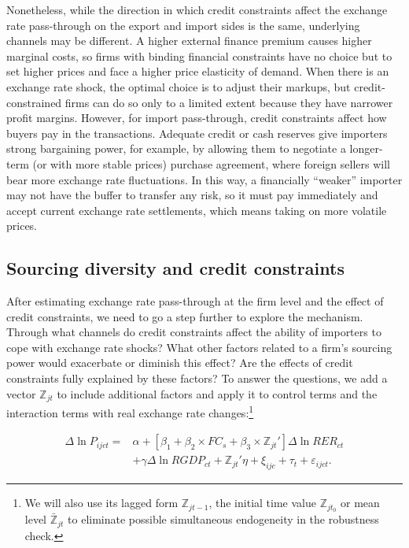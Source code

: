 Nonetheless, while the direction in which credit constraints affect the exchange rate pass-through on the export and import sides is the same, underlying channels may be different. A higher external finance premium causes higher marginal costs, so firms with binding financial constraints have no choice but to set higher prices and face a higher price elasticity of demand. When there is an exchange rate shock, the optimal choice is to adjust their markups, but credit-constrained firms can do so only to a limited extent because they have narrower profit margins. However, for import pass-through, credit constraints affect how buyers pay in the transactions. Adequate credit or cash reserves give importers strong bargaining power, for example, by allowing them to negotiate a longer-term (or with more stable prices) purchase agreement, where foreign sellers will bear more exchange rate fluctuations. In this way, a financially ``weaker'' importer may not have the buffer to transfer any risk, so it must pay immediately and accept current exchange rate settlements, which means taking on more volatile prices.

\subsection{Sourcing diversity and credit constraints}

After estimating exchange rate pass-through at the firm level and the effect of credit constraints, we need to go a step further to explore the mechanism. Through what channels do credit constraints affect the ability of importers to cope with exchange rate shocks? What other factors related to a firm's sourcing power would exacerbate or diminish this effect? Are the effects of credit constraints fully explained by these factors? To answer the questions, we add a vector $\mathbb{Z}_{jt}$ to include additional factors and apply it to control terms and the interaction terms with real exchange rate changes:\footnote{We will also use its lagged form $\mathbb{Z}_{jt-1}$, the initial time value $\mathbb{Z}_{jt_0}$ or mean level $\bar{\mathbb{Z}}_{jt}$ to eliminate possible simultaneous endogeneity in the robustness check.} 

\begin{equation}
    \begin{aligned}
    \Delta \ln P_{ijct}=&\alpha+[\beta_{1}+ \beta_{2} \times FC_{s}+\beta_{3} \times {\mathbb{Z}_{jt}}'] \Delta \ln RER_{ct} \\ &+\gamma \Delta \ln RGDP_{ct}+ {\mathbb{Z}_{jt}}' \eta+\xi_{ijc}+\tau_{t} +\varepsilon_{ijct}.
    \end{aligned}
    \label{eq.add.control}
\end{equation}

